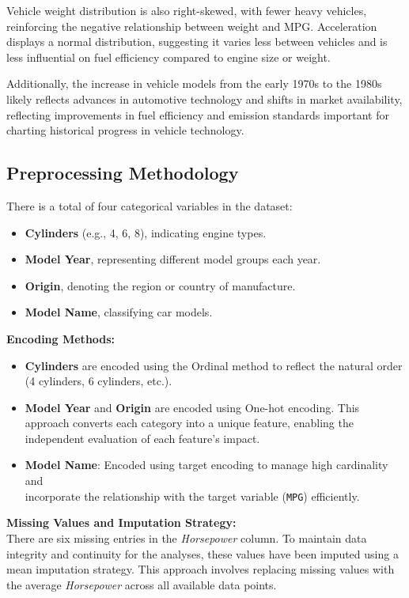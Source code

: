 \documentclass[11pt,a4paper]{article}
\begin{document}
\noindent
Vehicle weight distribution is also right-skewed, with fewer heavy vehicles, reinforcing the negative relationship between weight and MPG.
Acceleration displays a normal distribution, suggesting it varies less between vehicles and is less influential on fuel efficiency
compared to engine size or weight.
\vspace*{11pt}

\noindent
Additionally, the increase in vehicle models from the early 1970s to the 1980s likely reflects advances in automotive technology
and shifts in market availability, reflecting improvements in fuel efficiency and emission standards important for charting
historical progress in vehicle technology.

\subsection{Preprocessing Methodology}
There is a total of four categorical variables in the dataset:
\begin{itemize}
    \item \textbf{Cylinders} (e.g., 4, 6, 8), indicating engine types.
    \item \textbf{Model Year}, representing different model groups each year.
    \item \textbf{Origin}, denoting the region or country of manufacture.
    \item \textbf{Model Name}, classifying car models.
\end{itemize}
\textbf{Encoding Methods:}
\begin{itemize}
    \item \textbf{Cylinders} are encoded using the Ordinal method to reflect the natural order (4 cylinders, 6 cylinders, etc.).
    \item \textbf{Model Year} and \textbf{Origin} are encoded using One-hot encoding. This approach converts each category into a unique feature,
          enabling the independent evaluation of each feature's impact.
    \item \textbf{Model Name}: Encoded using target encoding to manage high cardinality and \\ incorporate the relationship with the target variable (\texttt{MPG}) efficiently.
\end{itemize}
\textbf{Missing Values and Imputation Strategy:}\\
There are six missing entries in the \textit{Horsepower} column. To maintain data integrity and continuity for the analyses,
these values have been imputed using a mean imputation strategy. This approach involves replacing missing values with the
average \textit{Horsepower} across all available data points.
\end{document}
